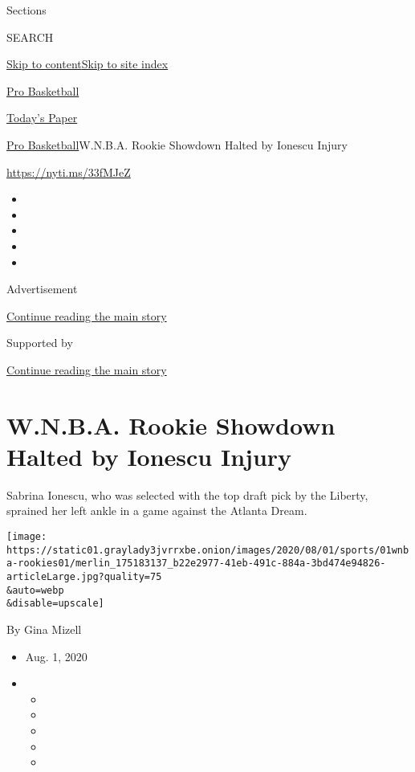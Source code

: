 Sections

SEARCH

\protect\hyperlink{site-content}{Skip to
content}\protect\hyperlink{site-index}{Skip to site index}

\href{https://www.nytimes3xbfgragh.onion/section/sports/basketball}{Pro
Basketball}

\href{https://myaccount.nytimes3xbfgragh.onion/auth/login?response_type=cookie\&client_id=vi}{}

\href{https://www.nytimes3xbfgragh.onion/section/todayspaper}{Today's
Paper}

\href{/section/sports/basketball}{Pro Basketball}\textbar{}W.N.B.A.
Rookie Showdown Halted by Ionescu Injury

\url{https://nyti.ms/33fMJeZ}

\begin{itemize}
\item
\item
\item
\item
\item
\end{itemize}

Advertisement

\protect\hyperlink{after-top}{Continue reading the main story}

Supported by

\protect\hyperlink{after-sponsor}{Continue reading the main story}

\hypertarget{wnba-rookie-showdown-halted-by-ionescu-injury}{%
\section{W.N.B.A. Rookie Showdown Halted by Ionescu
Injury}\label{wnba-rookie-showdown-halted-by-ionescu-injury}}

Sabrina Ionescu, who was selected with the top draft pick by the
Liberty, sprained her left ankle in a game against the Atlanta Dream.

\texttt{[image: https://static01.graylady3jvrrxbe.onion/images/2020/08/01/sports/01wnba-rookies01/merlin\_175183137\_b22e2977-41eb-491c-884a-3bd474e94826-articleLarge.jpg?quality=75\\\&auto=webp\\\&disable=upscale]}

By Gina Mizell

\begin{itemize}
\item
  Aug. 1, 2020
\item
  \begin{itemize}
  \item
  \item
  \item
  \item
  \item
  \end{itemize}
\end{itemize}

